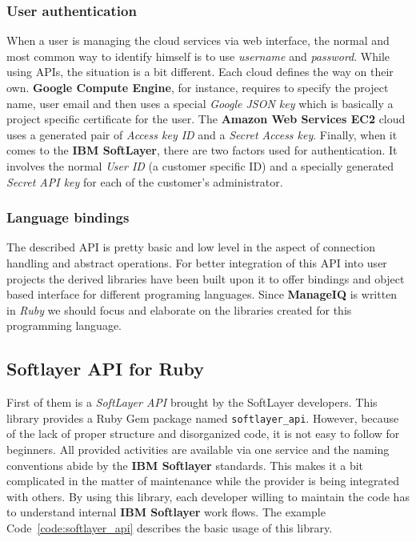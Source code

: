 \subsubsection{User authentication}
\label{subs:User authentication}

When a user is managing the cloud services via web interface, the normal and most common way to identify himself is to use \emph{username} and \emph{password}. While using APIs, the situation is a bit different. Each cloud defines the way on their own. \textbf{Google Compute Engine}, for instance, requires to specify the project name, user email and then uses a special \emph{Google JSON key} which is basically a project specific certificate for the user. The \textbf{Amazon Web Services EC2} cloud uses a generated pair of \emph{Access key ID} and a \emph{Secret Access key}. Finally, when it comes to the \textbf{IBM SoftLayer}, there are two factors used for authentication. It involves the normal \emph{User ID} (a customer specific ID) and a specially generated \emph{Secret API key} for each of the customer's administrator.

\subsubsection{Language bindings}
\label{subs:Language bindings}

The described API is pretty basic and low level in the aspect of connection handling and abstract operations. For better integration of this API into user projects the derived libraries have been built upon it to offer bindings and object based interface for different programing languages. Since \textbf{ManageIQ} is written in \emph{Ruby} we should focus and elaborate on the libraries created for this programming language.

\subsection{Softlayer API for Ruby}
\label{sub:Softlayer-API}

First of them is a \emph{SoftLayer API} brought by the SoftLayer developers\cite{softlayer_api}. This library provides a Ruby Gem package named \texttt{softlayer\_api}. However, because of the lack of proper structure and disorganized code, it is not easy to follow for beginners. All provided activities are available via one service and the naming conventions abide by the \textbf{IBM Softlayer} standards. This makes it a bit complicated in the matter of maintenance while the provider is being integrated with others. By using this library, each developer willing to maintain the code has to understand internal \textbf{IBM Softlayer} work flows. The example Code~\ref{code:softlayer_api} describes the basic usage of this library.


